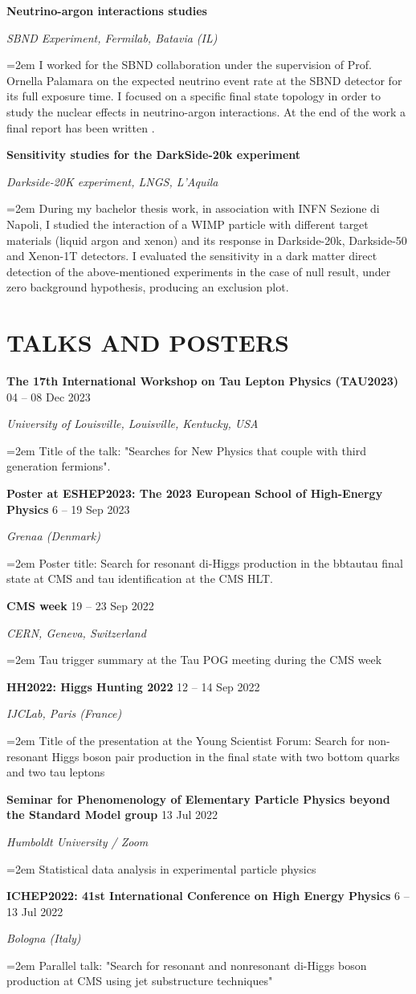 \documentclass[paper=a4,fontsize=12pt]{article} %
\newcommand{\sepspace}{\vspace*{1em}}		%
\newcommand{\NewPart}[1]{\section*{\uppercase{#1}}}
\newcommand{\EducationEntry}[4]{
	\noindent \textbf{#1} \hfill      %
	{#2} \par  %
	\noindent \textit{#3} \par        %
	\noindent\hangindent=2em\hangafter=0 \small #4 %
	\normalsize \par}
\begin{document}
    \vspace{-1mm}
    \sepspace   \vspace{2mm}
    \EducationEntry{Neutrino-argon interactions studies}{}{SBND Experiment, Fermilab, Batavia (IL)}{I worked for the SBND collaboration under the supervision of Prof. Ornella Palamara on the expected neutrino event rate at the SBND detector for its full exposure time. I focused on a specific final state topology in order to study the nuclear effects in neutrino-argon interactions. At the end of the work a final report has been written \cite{Fermilab_report}. }
    \sepspace
    \EducationEntry{Sensitivity studies for the DarkSide-20k experiment}{}{Darkside-20K experiment, LNGS, L'Aquila}{During my bachelor thesis work, in association with INFN Sezione di Napoli, I studied the interaction of a WIMP particle with different target materials (liquid argon and xenon) and its response in Darkside-20k, Darkside-50 and Xenon-1T detectors. I evaluated the sensitivity in a dark matter direct detection of the above-mentioned experiments in the case of null result, under zero background hypothesis, producing an exclusion plot.}
    \sepspace 
	\NewPart{Talks and posters}
	\EducationEntry{The 17th International Workshop on Tau Lepton Physics (TAU2023)}{04 -- 08 Dec 2023}{University of Louisville, Louisville, Kentucky, USA}{Title of the talk: "Searches for New Physics that couple with third generation fermions". \cite{Tau2023}}
	\sepspace
	\EducationEntry{Poster at ESHEP2023: The 2023 European School of High-Energy Physics}{6 -- 19 Sep 2023}{Grenaa (Denmark)}{Poster title: Search for resonant di-Higgs production in the bbtautau final state at CMS and tau identification at the CMS HLT. \cite{ESHEP_Indico}}
	\sepspace
	\EducationEntry{CMS week}{19 -- 23 Sep 2022}{CERN, Geneva, Switzerland}{Tau trigger summary at the Tau POG meeting during the CMS week \cite{cmsWeek22}}
	\sepspace 
	\EducationEntry{HH2022: Higgs Hunting 2022}{12 -- 14 Sep 2022}{IJCLab, Paris (France)}{Title of the presentation at the Young Scientist Forum: Search for non-resonant Higgs boson pair production in the final state with two bottom quarks and two tau leptons \cite{HH2022}}
	\sepspace	
	\EducationEntry{Seminar for Phenomenology of Elementary Particle Physics beyond the Standard Model group}{13 Jul 2022}{Humboldt University / Zoom}{Statistical data analysis in experimental particle physics \cite{humbolt}}
	\sepspace 
	\EducationEntry{ICHEP2022: 41st International Conference on High Energy Physics}{6 -- 13 Jul 2022}{Bologna (Italy)}{Parallel talk: "Search for resonant and nonresonant di-Higgs boson production at CMS using jet substructure techniques" \cite{ICHEP}}
\end{document}
